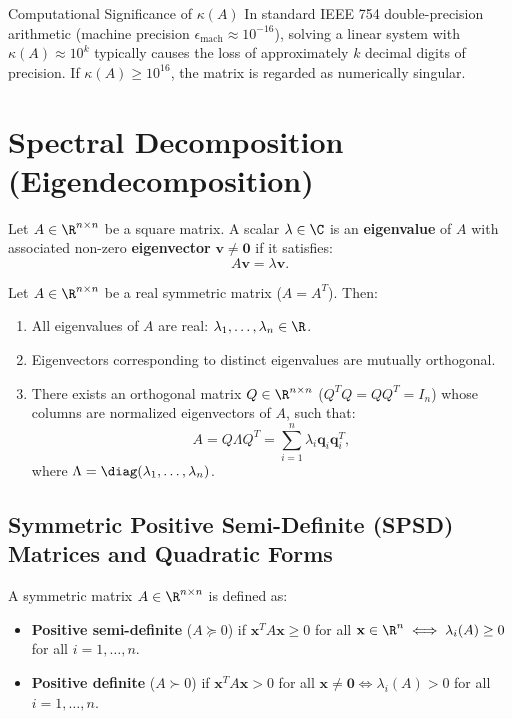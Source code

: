 \begin{alertblock}{Computational Significance of $\kappa(A)$}
In standard IEEE 754 double-precision arithmetic (machine precision $\epsilon_{\text{mach}} \approx 10^{-16}$), solving a linear system with $\kappa(A) \approx 10^k$ typically causes the loss of approximately $k$ decimal digits of precision. If $\kappa(A) \ge 10^{16}$, the matrix is regarded as numerically singular.
\end{alertblock}

\FloatBarrier
\section{Spectral Decomposition (Eigendecomposition)}

Let $A \in \R^{n \times n}$ be a square matrix. A scalar $\lambda \in \C$ is an \textbf{eigenvalue} of $A$ with associated non-zero \textbf{eigenvector} $\mathbf{v} \ne \mathbf{0}$ if it satisfies:
\begin{equation}
    A \mathbf{v} = \lambda \mathbf{v}.
\end{equation}

\begin{theorem}
Let $A \in \R^{n \times n}$ be a real symmetric matrix ($A = A^T$). Then:
\begin{enumerate}
    \item All eigenvalues of $A$ are real: $\lambda_1, \dots, \lambda_n \in \R$.
    \item Eigenvectors corresponding to distinct eigenvalues are mutually orthogonal.
    \item There exists an orthogonal matrix $Q \in \R^{n \times n}$ ($Q^T Q = Q Q^T = I_n$) whose columns are normalized eigenvectors of $A$, such that:
    \begin{equation}
        A = Q \Lambda Q^T = \sum_{i=1}^n \lambda_i \mathbf{q}_i \mathbf{q}_i^T,
    \end{equation}
    where $\Lambda = \diag(\lambda_1, \dots, \lambda_n)$.
\end{enumerate}
\end{theorem}

\subsection{Symmetric Positive Semi-Definite (SPSD) Matrices and Quadratic Forms}

A symmetric matrix $A \in \R^{n \times n}$ is defined as:
\begin{itemize}
    \item \textbf{Positive semi-definite} ($A \succeq 0$) if $\mathbf{x}^T A \mathbf{x} \ge 0$ for all $\mathbf{x} \in \R^n \iff \lambda_i(A) \ge 0$ for all $i=1,\dots,n$.
    \item \textbf{Positive definite} ($A \succ 0$) if $\mathbf{x}^T A \mathbf{x} > 0$ for all $\mathbf{x} \ne \mathbf{0} \iff \lambda_i(A) > 0$ for all $i=1,\dots,n$.
\end{itemize}

